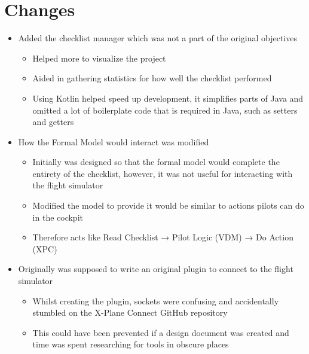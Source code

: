 \documentclass[../dissertation.tex]{subfiles}
\begin{document}
\section{Changes}
\begin{itemize}
  \item Added the checklist manager which was not a part of the original
    objectives
  \begin{itemize}
    \item Helped more to visualize the project
    \item Aided in gathering statistics for how well the checklist performed
    \item Using Kotlin helped speed up development, it simplifies parts
      of Java and omitted a lot of boilerplate code that is required in Java,
      such as setters and getters
  \end{itemize}
  \item How the Formal Model would interact was modified
  \begin{itemize}
    \item Initially was designed so that the formal model would complete
      the entirety of the checklist, however, it was not useful for interacting
      with the flight simulator
    \item Modified the model to provide it would be similar to actions pilots can
      do in the cockpit
    \item Therefore acts like Read Checklist → Pilot Logic (VDM) → Do Action (XPC)
  \end{itemize}
  \item Originally was supposed to write an original plugin to connect to the flight simulator
  \begin{itemize}
    \item Whilst creating the plugin, sockets were confusing and accidentally stumbled
      on the X-Plane Connect GitHub repository
    \item This could have been prevented if a design document was created and
      time was spent researching for tools in obscure places
  \end{itemize}
\end{itemize}

\end{document}

